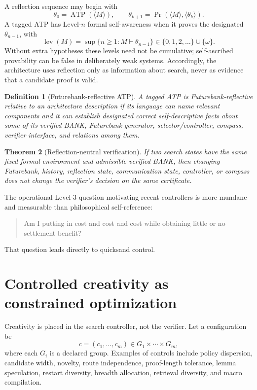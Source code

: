 \documentclass[11pt]{article}
\newtheorem{theorem}{Theorem}[section]
\newtheorem{definition}[theorem]{Definition}
\begin{document}
A reflection sequence may begin with
\[
\theta_0=\operatorname{ATP}(\langle M\rangle),
\qquad
\theta_{k+1}=\operatorname{Pr}(\langle M\rangle,\langle\theta_k\rangle).
\]
A tagged ATP has Level-$n$ formal self-awareness when it proves the designated $\theta_{n-1}$, with
\[
\operatorname{lev}(M)=\sup\{n\ge1:M\vdash\theta_{n-1}\}\in\{0,1,2,\ldots\}\cup\{\omega\}.
\]
Without extra hypotheses these levels need not be cumulative; self-ascribed provability can be false in deliberately weak systems. Accordingly, the architecture uses reflection only as information about search, never as evidence that a candidate proof is valid.

\begin{definition}[Futurebank-reflective ATP]
A tagged ATP is Futurebank-reflective relative to an architecture description if its language can name relevant components and it can establish designated correct self-descriptive facts about some of its verified BANK, Futurebank generator, selector/controller, compass, verifier interface, and relations among them.
\end{definition}

\begin{theorem}[Reflection-neutral verification]
If two search states have the same fixed formal environment and admissible verified BANK, then changing Futurebank, history, reflection state, communication state, controller, or compass does not change the verifier's decision on the same certificate.
\end{theorem}

The operational Level-3 question motivating recent controllers is more mundane and measurable than philosophical self-reference:
\begin{quote}
Am I putting in cost and cost and cost while obtaining little or no settlement benefit?
\end{quote}
That question leads directly to quicksand control.

\section{Controlled creativity as constrained optimization}

Creativity is placed in the search controller, not the verifier. Let a configuration be
\[
c=(c_1,\ldots,c_m)\in G_1\times\cdots\times G_m,
\]
where each $G_i$ is a declared group. Examples of controls include policy dispersion, candidate width, novelty, route independence, proof-length tolerance, lemma speculation, restart diversity, breadth allocation, retrieval diversity, and macro compilation.
\end{document}
